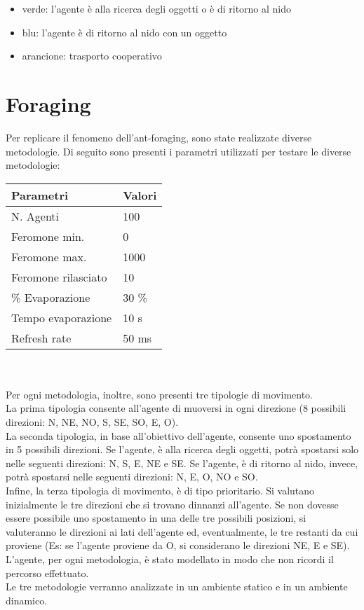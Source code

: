 \documentclass[12pt,a4paper,openright,twoside]{report}
\begin{document}
\begin{itemize}
	\item verde: l'agente è alla ricerca degli oggetti o è di ritorno al nido
	\item blu: l'agente è di ritorno al nido con un oggetto
	\item arancione: trasporto cooperativo
\end{itemize}

\section{Foraging}

Per replicare il fenomeno dell'ant-foraging, sono state realizzate diverse metodologie.
Di seguito sono presenti i parametri utilizzati per testare le diverse metodologie:\\

\begin{tabular}{p{5cm}|p{5cm}} 
	 \textbf{ Parametri} & \textbf{ Valori} \\ \hline
	 N. Agenti & 100 \\
	 Feromone min. & 0 \\
	 Feromone max. & 1000 \\
	 Feromone rilasciato & 10\\
	 \% Evaporazione & 30 \% \\
	 Tempo evaporazione & 10 s \\
	 Refresh rate & 50 ms 
\end{tabular}
\\\\
Per ogni metodologia, inoltre, sono presenti tre tipologie di movimento.\\ La prima tipologia consente all'agente di muoversi in ogni direzione (8 possibili direzioni: N, NE, NO, S, SE, SO, E, O).\\
La seconda tipologia, in base all'obiettivo dell'agente, consente uno spostamento in 5 possibili direzioni. Se l'agente, è alla ricerca degli oggetti, potrà spostarsi solo nelle seguenti direzioni: N, S, E, NE e SE.  Se l'agente, è di ritorno al nido, invece, potrà spostarsi nelle seguenti direzioni: N, E, O, NO e SO.\\
Infine, la terza tipologia di movimento, è di tipo prioritario. Si valutano inizialmente le tre direzioni che si trovano dinnanzi all'agente. Se non dovesse essere possibile uno spostamento in una delle tre possibili posizioni, si valuteranno le direzioni ai lati dell'agente ed, eventualmente, le tre restanti da cui proviene (Es: se l'agente proviene da O, si considerano le direzioni NE, E e SE).\\
L'agente, per ogni metodologia, è stato modellato in modo che non ricordi il percorso effettuato.\\
Le tre metodologie verranno analizzate in un ambiente statico e in un ambiente dinamico.
\end{document}
